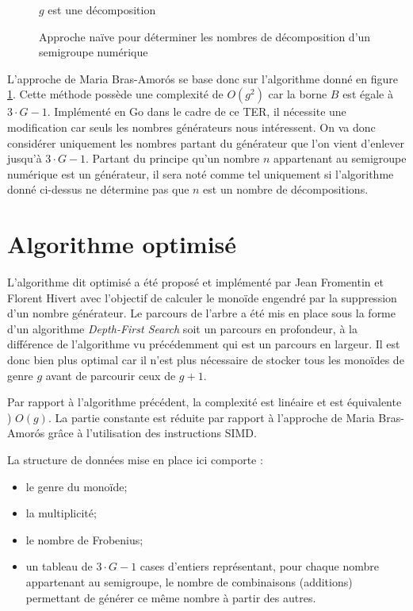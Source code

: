 \documentclass[12pt,a4paper]{report}
\begin{document}
\begin{figure}[h]
	\begin{algorithmic}
						\STATE $g$ est une décomposition
					\ENDIF
				\ENDFOR
			\ENDIF
		\ENDFOR
	\end{algorithmic}
	\caption{Approche naïve pour déterminer les nombres de décomposition d'un semigroupe numérique}
	\label{fig:nalg}
\end{figure}

L'approche de Maria Bras-Amorós se base donc sur l'algorithme donné en figure \ref{fig:nalg}. Cette méthode possède une complexité de $O(g^2)$ car la borne $B$ est égale à $3 \cdot G - 1$. Implémenté en Go dans le cadre de ce TER, il nécessite une modification car seuls les nombres générateurs nous intéressent. On va donc considérer uniquement les nombres partant du générateur que l'on vient d'enlever jusqu'à $3 \cdot G - 1$. Partant du principe qu'un nombre $n$ appartenant au semigroupe numérique est un générateur, il sera noté comme tel uniquement si l'algorithme donné ci-dessus ne détermine pas que $n$ est un nombre de décompositions.

\section{Algorithme optimisé}
L'algorithme dit optimisé a été proposé et implémenté par Jean Fromentin et Florent Hivert \cite{exploring-ns} avec l'objectif de calculer le monoïde engendré par la suppression d'un nombre générateur. Le parcours de l'arbre a été mis en place sous la forme d'un algorithme \emph{Depth-First Search} soit un parcours en profondeur, à la différence de l'algorithme vu précédemment qui est un parcours en largeur. Il est donc bien plus optimal car il n'est plus nécessaire de stocker tous les monoïdes de genre $g$ avant de parcourir ceux de $g + 1$.

Par rapport à l'algorithme précédent, la complexité est linéaire et est équivalente ) $O(g)$. La partie constante est réduite par rapport à l'approche de Maria Bras-Amorós grâce à l'utilisation des instructions SIMD.

La structure de données mise en place ici comporte :
\begin{itemize}
	\item	le genre du monoïde;
	\item	la multiplicité;
	\item	le nombre de Frobenius;
	\item	un tableau de $3 \cdot G - 1$ cases d'entiers représentant, pour chaque nombre appartenant au semigroupe, le nombre de combinaisons (additions) permettant de générer ce même nombre à partir des autres.
\end{itemize}
\end{document}
